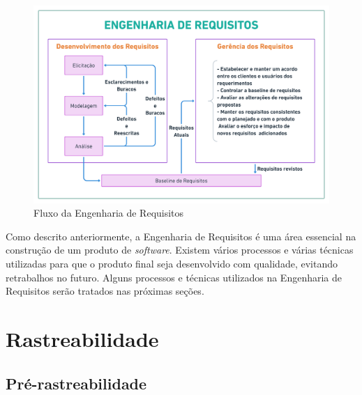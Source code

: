 \begin{itemize}
    \begin{figure}[htb]
        \begin{center}
            \caption{Fluxo da Engenharia de Requisitos}
            \label{eng_req_flux}
            \includegraphics[scale=0.15]{figuras/Embasamento/eng_req_fluxo.png}
        \end{center}
    \end{figure}
    
\end{itemize}

Como descrito anteriormente, a Engenharia de Requisitos é uma área essencial na construção de um produto de \textit{software}. Existem vários processos e várias técnicas utilizadas para que o produto final seja desenvolvido com qualidade, evitando retrabalhos no futuro. Alguns processos e técnicas utilizados na Engenharia de Requisitos serão tratados nas próximas seções.

\section{Rastreabilidade}

\label{sec:rastreabilidade}

\subsection{Pré-rastreabilidade}

\label{sec:pre-rastreabilidade}

